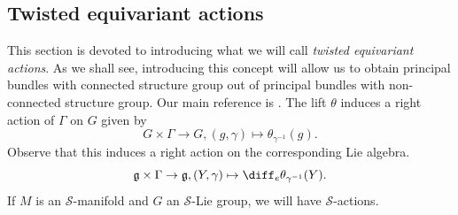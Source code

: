 \subsection{Twisted equivariant actions}
This section is devoted to introducing what we will call \textit{twisted equivariant actions}. As we shall see, introducing this concept will allow us to obtain principal bundles with connected structure group out of principal bundles with non-connected structure group. Our main reference is \parencite{barajas2023non}. The lift \(\theta\) induces a right action of \(\Gamma\) on \(G\) given by 
\begin{equation} \label{eq_Gamma_action_G}
G \times \Gamma \longrightarrow G, (g, \gamma) \mapsto \theta_{\gamma^{-1}}(g).
\end{equation}
Observe that this induces a right action on the corresponding Lie algebra.
\begin{equation} \label{eq_Gamma_action_Lie_algebra}
\mathfrak{g} \times \Gamma \to \mathfrak{g}, (Y, \gamma) \mapsto \diff_e\theta_{\gamma^{-1}}(Y).
\end{equation}
If \(M\) is an \(\mathcal{S}\)-manifold and \(G\) an \(\mathcal{S}\)-Lie group, we will have \(\mathcal{S}\)-actions.

